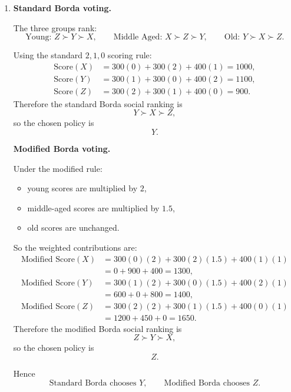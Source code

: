 \documentclass[12pt]{article}
\begin{document}
\begin{enumerate}[label=(\alph*)]
    Hence
    \[
    \boxed{\text{the modified Borda rule satisfies the Pareto condition.}}
    \]

    \item
    \textbf{Standard Borda voting.}

    The three groups rank:
    \[
    \text{Young: } Z \succ Y \succ X,
    \qquad
    \text{Middle Aged: } X \succ Z \succ Y,
    \qquad
    \text{Old: } Y \succ X \succ Z.
    \]

    Using the standard \(2,1,0\) scoring rule:
    \[
    \begin{aligned}
    \text{Score}(X)
    &=300(0)+300(2)+400(1)=1000,\\
    \text{Score}(Y)
    &=300(1)+300(0)+400(2)=1100,\\
    \text{Score}(Z)
    &=300(2)+300(1)+400(0)=900.
    \end{aligned}
    \]
    Therefore the standard Borda social ranking is
    \[
    Y \succ X \succ Z,
    \]
    so the chosen policy is
    \[
    \boxed{Y.}
    \]

    \bigskip

    \textbf{Modified Borda voting.}

    Under the modified rule:
    \begin{itemize}[leftmargin=*]
        \item young scores are multiplied by \(2\),
        \item middle-aged scores are multiplied by \(1.5\),
        \item old scores are unchanged.
    \end{itemize}

    So the weighted contributions are:
    \[
    \begin{aligned}
    \text{Modified Score}(X)
    &=300(0)(2)+300(2)(1.5)+400(1)(1)\\
    &=0+900+400=1300,\\
    \text{Modified Score}(Y)
    &=300(1)(2)+300(0)(1.5)+400(2)(1)\\
    &=600+0+800=1400,\\
    \text{Modified Score}(Z)
    &=300(2)(2)+300(1)(1.5)+400(0)(1)\\
    &=1200+450+0=1650.
    \end{aligned}
    \]
    Therefore the modified Borda social ranking is
    \[
    Z \succ Y \succ X,
    \]
    so the chosen policy is
    \[
    \boxed{Z.}
    \]

    Hence
    \[
    \boxed{\text{Standard Borda chooses }Y,\qquad \text{Modified Borda chooses }Z.}
    \]


\end{enumerate}
\end{document}
